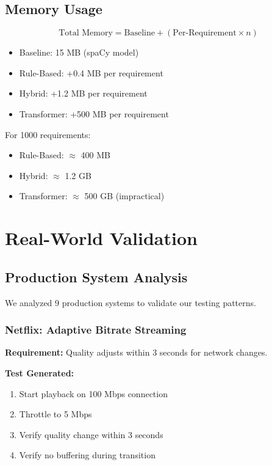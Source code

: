 \documentclass[12pt,oneside]{report}
\begin{document}
\section{Memory Usage}

\begin{equation}
\text{Total Memory} = \text{Baseline} + (\text{Per-Requirement} \times n)
\end{equation}

\begin{itemize}
    \item Baseline: 15 MB (spaCy model)
    \item Rule-Based: +0.4 MB per requirement
    \item Hybrid: +1.2 MB per requirement
    \item Transformer: +500 MB per requirement
\end{itemize}

For 1000 requirements:
\begin{itemize}
    \item Rule-Based: $\approx$ 400 MB
    \item Hybrid: $\approx$ 1.2 GB
    \item Transformer: $\approx$ 500 GB (impractical)
\end{itemize}


\chapter{Real-World Validation}

\section{Production System Analysis}

We analyzed 9 production systems to validate our testing patterns.

\subsection{Netflix: Adaptive Bitrate Streaming}

\textbf{Requirement:} Quality adjusts within 3 seconds for network changes.

\textbf{Test Generated:}
\begin{enumerate}
    \item Start playback on 100 Mbps connection
    \item Throttle to 5 Mbps
    \item Verify quality change within 3 seconds
    \item Verify no buffering during transition
\end{enumerate}
\end{document}
